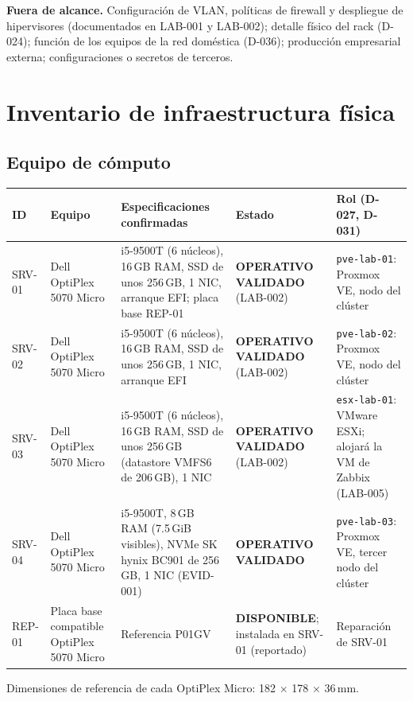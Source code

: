 \documentclass[11pt,a4paper]{article}
\newcommand{\estadobase}[2]{\textcolor{#1}{\textbf{\footnotesize #2}}}
\newcommand{\disp}{\estadobase{okgreen}{DISPONIBLE}}
\newcommand{\opval}{\estadobase{okgreen}{OPERATIVO VALIDADO}}
\begin{document}
\textbf{Fuera de alcance.} Configuración de VLAN, políticas de firewall y despliegue de hipervisores (documentados en LAB-001 y LAB-002); detalle físico del rack (D-024); función de los equipos de la red doméstica (D-036); producción empresarial externa; configuraciones o secretos de terceros.

\section{Inventario de infraestructura física}\label{sec:inventario}
\subsection{Equipo de cómputo}
{\small
\begin{longtable}{L{1.5cm} L{2.8cm} L{4.4cm} L{2.8cm} L{2.7cm}}
  \toprule
  \textbf{ID} & \textbf{Equipo} & \textbf{Especificaciones confirmadas} & \textbf{Estado} & \textbf{Rol (D-027, D-031)}\\
  \midrule
  \endhead
  SRV-01 & Dell OptiPlex 5070 Micro & i5-9500T (6 núcleos), 16\,GB RAM, SSD de unos 256\,GB, 1 NIC, arranque EFI; placa base REP-01 & \opval{} (LAB-002) & \texttt{pve-lab-01}: Proxmox VE, nodo del clúster\\
  SRV-02 & Dell OptiPlex 5070 Micro & i5-9500T (6 núcleos), 16\,GB RAM, SSD de unos 256\,GB, 1 NIC, arranque EFI & \opval{} (LAB-002) & \texttt{pve-lab-02}: Proxmox VE, nodo del clúster\\
  SRV-03 & Dell OptiPlex 5070 Micro & i5-9500T (6 núcleos), 16\,GB RAM, SSD de unos 256\,GB (datastore VMFS6 de 206\,GB), 1 NIC & \opval{} (LAB-002) & \texttt{esx-lab-01}: VMware ESXi; alojará la VM de Zabbix (LAB-005)\\
  SRV-04 & Dell OptiPlex 5070 Micro & i5-9500T, 8\,GB RAM (7.5\,GiB visibles), NVMe SK hynix BC901 de 256\,GB, 1 NIC (EVID-001) & \opval & \texttt{pve-lab-03}: Proxmox VE, tercer nodo del clúster\\
  REP-01 & Placa base compatible OptiPlex 5070 Micro & Referencia P01GV & \disp; instalada en SRV-01 (reportado) & Reparación de SRV-01\\
  \bottomrule
\end{longtable}
}

Dimensiones de referencia de cada OptiPlex Micro: 182 $\times$ 178 $\times$ 36\,mm.
\end{document}
